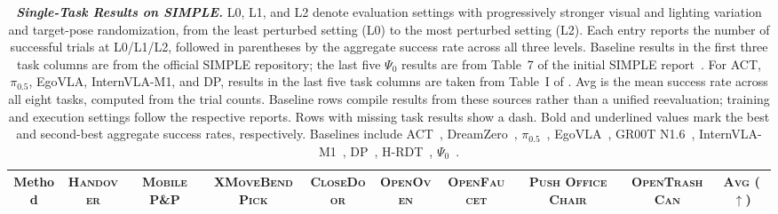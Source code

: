 \begin{table}[!b]
  \caption{
    \textbf{\textit{Single-Task Results on SIMPLE.}} L0, L1, and L2 denote evaluation settings with progressively stronger visual and lighting variation and target-pose randomization, from the least perturbed setting (L0) to the most perturbed setting (L2). Each entry reports the number of successful trials at L0/L1/L2, followed in parentheses by the aggregate success rate across all three levels. Baseline results in the first three task columns are from the official SIMPLE repository; the last five $\Psi_0$ results are from Table~7 of the initial SIMPLE report~\citep{simple}. For ACT, $\pi_{0.5}$, EgoVLA, InternVLA-M1, and DP, results in the last five task columns are taken from Table~I of \citet{chen2026memorybeforegoal}. Avg is the mean success rate across all eight tasks, computed from the trial counts. Baseline rows compile results from these sources rather than a unified reevaluation; training and execution settings follow the respective reports. Rows with missing task results show a dash. Bold and underlined values mark the best and second-best aggregate success rates, respectively.
   Baselines include ACT~\citep{ACT}, DreamZero~\citep{dreamzero}, $\pi_{0.5}$~\citep{pi05}, EgoVLA~\citep{egovla}, GR00T N1.6~\citep{grootn1}, InternVLA-M1~\citep{internvla_m1}, DP~\citep{chi2023diffusionpolicy}, H-RDT~\citep{hrdt}, $\Psi_0$~\citep{psi0}.
  }
  \label{table:simple_main_results}
  \centering
  \setlength{\tabcolsep}{0pt}
  \renewcommand{\arraystretch}{1.08}
  \fontsize{6.2}{7}\selectfont
  \newcommand{\taskheader}[1]{{\fontsize{5.55}{6.2}\selectfont\textbf{\textsc{\hspace{2.2pt}#1\hspace{2.2pt}}}}}
  \newcommand{\resultentry}[2]{{\fontsize{5.2}{6}\selectfont\hspace{2.2pt}#1\;(#2)\hspace{2.2pt}}}
  \newcommand{\bestentry}[2]{{\fontsize{5.2}{6}\selectfont\textbf{\hspace{2.2pt}#1\;(#2)\hspace{2.2pt}}}}
  \newcommand{\secondentry}[2]{{\fontsize{5.2}{6}\selectfont\hspace{2.2pt}\underline{#1\;(#2)}\hspace{2.2pt}}}

  \newcommand{\avgentry}[1]{{\fontsize{5.2}{6}\selectfont\hspace{2.2pt}#1\hspace{2.2pt}}}
  \begin{adjustbox}{width=\textwidth}
  \begin{tabular}{@{}c*{9}{c}@{}}
    \toprule
    {\fontsize{5.55}{6.2}\selectfont\textbf{Method}}
    & \taskheader{Handover}
    & \taskheader{Mobile P\&P}
    & \taskheader{XMoveBendPick}
    & \taskheader{CloseDoor}
    & \taskheader{OpenOven}
    & \taskheader{OpenFaucet}
    & \taskheader{Push Office Chair}
    & \taskheader{OpenTrashCan}
    & \taskheader{Avg ($\uparrow$)} \\
    \midrule


\end{tabular}
\end{adjustbox}
\end{table}
